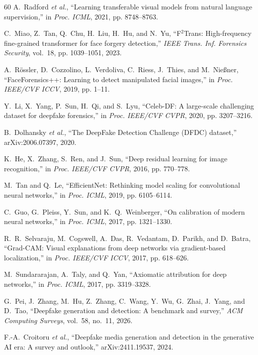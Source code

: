 \documentclass[journal]{IEEEtran}
\begin{document}
\begin{thebibliography}{60}
 A.~Radford \textit{et al.}, ``Learning transferable visual models from natural language supervision,'' in \textit{Proc. ICML}, 2021, pp. 8748--8763.

 C.~Miao, Z.~Tan, Q.~Chu, H.~Liu, H.~Hu, and N.~Yu, ``F$^2$Trans: High-frequency fine-grained transformer for face forgery detection,'' \textit{IEEE Trans. Inf. Forensics Security}, vol.~18, pp. 1039--1051, 2023.

 A.~R\"ossler, D.~Cozzolino, L.~Verdoliva, C.~Riess, J.~Thies, and M.~Nie{\ss}ner, ``FaceForensics++: Learning to detect manipulated facial images,'' in \textit{Proc. IEEE/CVF ICCV}, 2019, pp. 1--11.

 Y.~Li, X.~Yang, P.~Sun, H.~Qi, and S.~Lyu, ``Celeb-DF: A large-scale challenging dataset for deepfake forensics,'' in \textit{Proc. IEEE/CVF CVPR}, 2020, pp. 3207--3216.

 B.~Dolhansky \textit{et al.}, ``The DeepFake Detection Challenge (DFDC) dataset,'' arXiv:2006.07397, 2020.

 K.~He, X.~Zhang, S.~Ren, and J.~Sun, ``Deep residual learning for image recognition,'' in \textit{Proc. IEEE/CVF CVPR}, 2016, pp. 770--778.

 M.~Tan and Q.~Le, ``EfficientNet: Rethinking model scaling for convolutional neural networks,'' in \textit{Proc. ICML}, 2019, pp. 6105--6114.

 C.~Guo, G.~Pleiss, Y.~Sun, and K.~Q.~Weinberger, ``On calibration of modern neural networks,'' in \textit{Proc. ICML}, 2017, pp. 1321--1330.

 R.~R.~Selvaraju, M.~Cogswell, A.~Das, R.~Vedantam, D.~Parikh, and D.~Batra, ``Grad-CAM: Visual explanations from deep networks via gradient-based localization,'' in \textit{Proc. IEEE/CVF ICCV}, 2017, pp. 618--626.

 M.~Sundararajan, A.~Taly, and Q.~Yan, ``Axiomatic attribution for deep networks,'' in \textit{Proc. ICML}, 2017, pp. 3319--3328.

 G.~Pei, J.~Zhang, M.~Hu, Z.~Zhang, C.~Wang, Y.~Wu, G.~Zhai, J.~Yang, and D.~Tao, ``Deepfake generation and detection: A benchmark and survey,'' \textit{ACM Computing Surveys}, vol.~58, no.~11, 2026.

 F.-A.~Croitoru \textit{et al.}, ``Deepfake media generation and detection in the generative AI era: A survey and outlook,'' arXiv:2411.19537, 2024.

\end{thebibliography}
\end{document}
